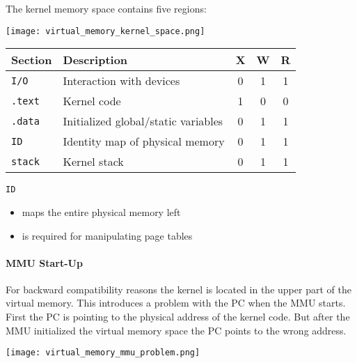 The kernel memory space contains five regions:

\begin{center}
    \texttt{[image: virtual\_memory\_kernel\_space.png]}
\end{center}

\renewcommand{\arraystretch}{1.3}
\setlength{\oldtabcolsep}{\tabcolsep}\setlength\tabcolsep{6pt}

\begin{tabularx}{\linewidth}{@{}lXccc@{}}
    Section        & Description                         & X & W & R \\
    \midrule
    \texttt{I/O}   & Interaction with devices            & 0 & 1 & 1 \\
    \texttt{.text} & Kernel code                         & 1 & 0 & 0 \\
    \texttt{.data} & Initialized global/static variables & 0 & 1 & 1 \\
    \texttt{ID}    & Identity map of physical memory     & 0 & 1 & 1 \\
    \texttt{stack} & Kernel stack                        & 0 & 1 & 1
\end{tabularx}

\newpar{}

\texttt{ID} 
\begin{itemize}
    \item maps the entire physical memory left
    \item is required for manipulating page tables
\end{itemize}

\renewcommand{\arraystretch}{1}
\setlength\tabcolsep{\oldtabcolsep}

\paragraph{MMU Start-Up}

For backward compatibility reasons the kernel is located in the upper part of the virtual memory. This introduces a problem with the PC when the MMU starts. First the PC is pointing to the physical address of the kernel code. But after the MMU initialized the virtual memory space the PC points to the wrong address.

\begin{center}
    \texttt{[image: virtual\_memory\_mmu\_problem.png]}
\end{center}


